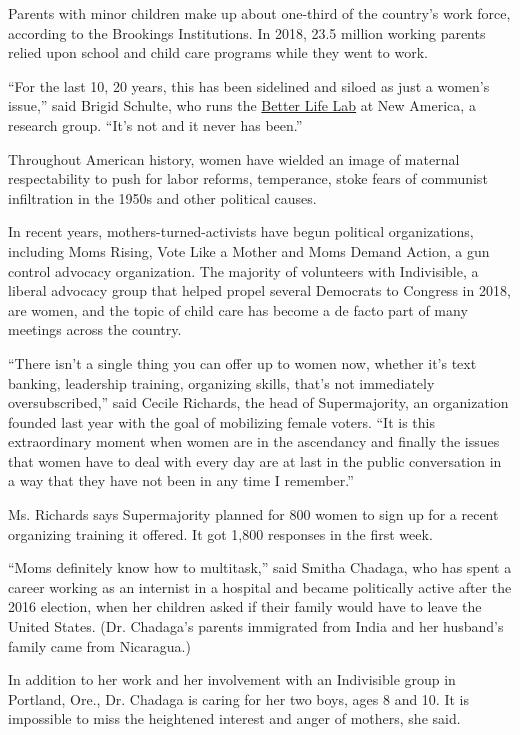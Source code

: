 Parents with minor children make up about one-third of the country's
work force, according to the Brookings Institutions. In 2018, 23.5
million working parents relied upon school and child care programs while
they went to work.

``For the last 10, 20 years, this has been sidelined and siloed as just
a women's issue,'' said Brigid Schulte, who runs the
\href{https://www.newamerica.org/better-life-lab/}{Better Life Lab} at
New America, a research group. ``It's not and it never has been.''

Throughout American history, women have wielded an image of maternal
respectability to push for labor reforms, temperance, stoke fears of
communist infiltration in the 1950s and other political causes.

In recent years, mothers-turned-activists have begun political
organizations, including Moms Rising, Vote Like a Mother and Moms Demand
Action, a gun control advocacy organization. The majority of volunteers
with Indivisible, a liberal advocacy group that helped propel several
Democrats to Congress in 2018, are women, and the topic of child care
has become a de facto part of many meetings across the country.

``There isn't a single thing you can offer up to women now, whether it's
text banking, leadership training, organizing skills, that's not
immediately oversubscribed,'' said Cecile Richards, the head of
Supermajority, an organization founded last year with the goal of
mobilizing female voters. ``It is this extraordinary moment when women
are in the ascendancy and finally the issues that women have to deal
with every day are at last in the public conversation in a way that they
have not been in any time I remember.''

Ms. Richards says Supermajority planned for 800 women to sign up for a
recent organizing training it offered. It got 1,800 responses in the
first week.

``Moms definitely know how to multitask,'' said Smitha Chadaga, who has
spent a career working as an internist in a hospital and became
politically active after the 2016 election, when her children asked if
their family would have to leave the United States. (Dr. Chadaga's
parents immigrated from India and her husband's family came from
Nicaragua.)

In addition to her work and her involvement with an Indivisible group in
Portland, Ore., Dr. Chadaga is caring for her two boys, ages 8 and 10.
It is impossible to miss the heightened interest and anger of mothers,
she said.

